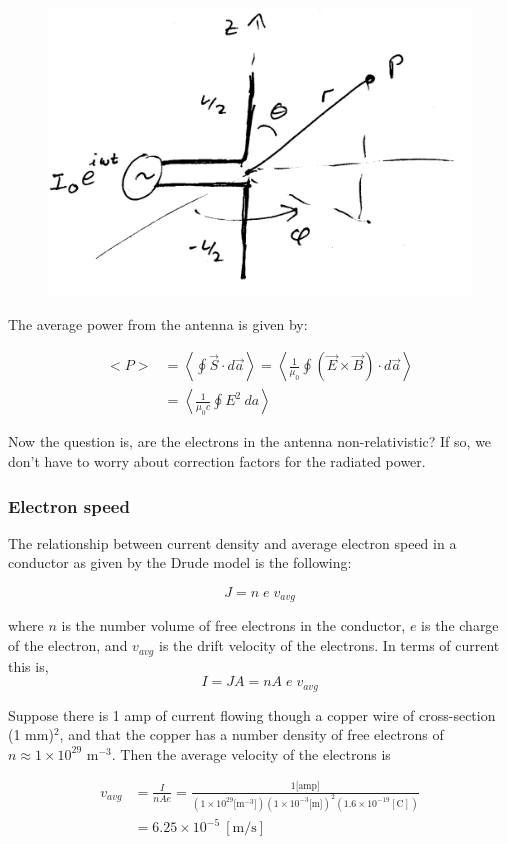 \documentclass[12pt]{article}
\begin{document}
\begin{flushleft}
\begin{figure}[h]
\centering
\includegraphics*[width=.5\columnwidth]{antenna.png}
\end{figure}

The average power from the antenna is given by:

\begin{equation*}
\begin{aligned}
<P> &  = \left< \oint \vec{S} \cdot d\vec{a} \right>  = \left< \frac{1}{\mu_{0}} \oint (\vec{E} \times \vec{B}) \cdot d\vec{a} \right> \\
 & = \left< \frac{1}{\mu_{0}c} \oint E^{2} \: da \right>
\end{aligned}
\end{equation*}

Now the question is, are the electrons in the antenna non-relativistic?  If so, we don't have to worry about  correction factors for the radiated power.

\subsubsection*{Electron speed}
The relationship between current density and average electron speed in a conductor as given by the Drude model is the following:

\[
J = n\; e \; v_{avg}
\]

where $n$ is the number volume of free electrons in the conductor, $e$ is the charge of the electron, and $v_{avg}$ is the drift velocity of the electrons.  In terms of current this is,
\[
I=JA=nA\; e \; v_{avg}
\]

Suppose there is 1 amp of current flowing though a copper wire of cross-section (1 mm)$^{2}$,  and that the copper has a number density of free electrons of $n \approx 1\times 10^{29}$ m$^{-3}$.  Then the average velocity of the electrons is 

\begin{equation*}
\begin{aligned}
v_{avg} & = \frac{I}{nAe} = \frac{1 \mbox{[amp]} }{ (1\times 10^{29} \mbox{[m$^{-3}$]}) (1 \times 10^{-3} \mbox{[m]} )^{2}(1.6 \times 10^{-19} [\mbox{C}] ) } \\
& = 6.25 \times 10^{-5} \: [\mbox{m}/\mbox{s}]
\end{aligned}
\end{equation*}


\end{flushleft}
\end{document}
